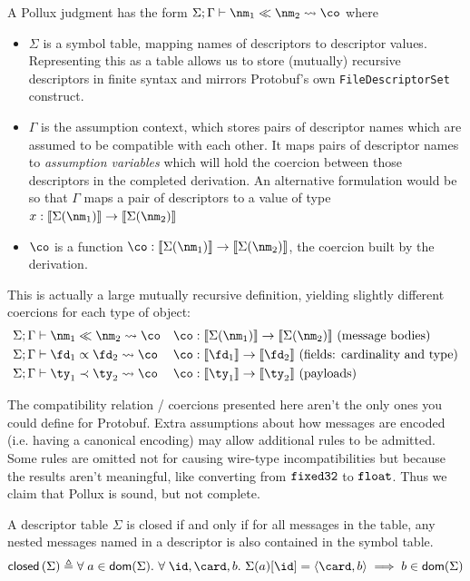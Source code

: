 A Pollux judgment has the form $\judg{\Gamma}{\nm_1 \dcompat \nm_2 \coerce \co}$ where
\begin{itemize}
\item $\Sigma$ is a symbol table, mapping names of descriptors to descriptor
  values. Representing this as a table allows us to store (mutually) recursive
  descriptors in finite syntax and mirrors Protobuf's own
  \texttt{FileDescriptorSet} construct.
\item $\Gamma$ is the assumption context, which stores pairs of descriptor names
  which are assumed to be compatible with each other. It maps pairs of
  descriptor names to \emph{assumption variables} which will hold the coercion
  between those descriptors in the completed derivation. An alternative
  formulation would be so that $\Gamma$ maps a pair of descriptors to a value of type
  $x : \denote{\Sigma(\nm_1)} \rightarrow \denote{\Sigma(\nm_2)}$ 
\item $\co$ is a function $\co : \denote{\Sigma(\nm_1)} \rightarrow \denote{\Sigma(\nm_2)}$, the coercion
  built by the derivation.
\end{itemize}

This is actually a large mutually recursive definition, yielding slightly
different coercions for each type of object:
\begin{align*}
  &\judg{\Gamma}{\nm_1 \dcompat \nm_2 \coerce \co}
  && \co : \denote{\Sigma(\nm_1)} \to \denote{\Sigma(\nm_2)} \text{ (message bodies)} \\
  &\judg{\Gamma}{\fd_1 \fieldrel \fd_2 \coerce \co}
  && \co : \denote{\fd_1} \to \denote{\fd_2} \text{ (fields: cardinality and type)} \\
  &\judg{\Gamma}{\ty_1 \typrel \ty_2 \coerce \co}
  && \co : \denote{\ty_1} \to \denote{\ty_2} \text{ (payloads)}
\end{align*}

The compatibility relation / coercions presented here aren't the only ones you
could define for Protobuf. Extra assumptions about how messages are encoded
(i.e. having a canonical encoding) may allow additional rules to be
admitted. Some rules are omitted not for causing wire-type incompatibilities but
because the results aren't meaningful, like converting from $\texttt{fixed32}$ to
$\texttt{float}$. Thus we claim that Pollux is sound, but not complete.

\vspace{1em}
\begin{definition}\label{def:sym-closed}
  A descriptor table $\Sigma$ is closed if and only if for all messages in the table,
  any nested messages named in a descriptor is also contained in the symbol
  table. 
  \[ \closed{\Sigma} \triangleq \forall\;a \in \dom{\Sigma}.\ \forall\;\id,\card,b.\ \Sigma(a)[\id] = \field{\card}{b}
    \implies b \in \dom{\Sigma} \]
\end{definition}


